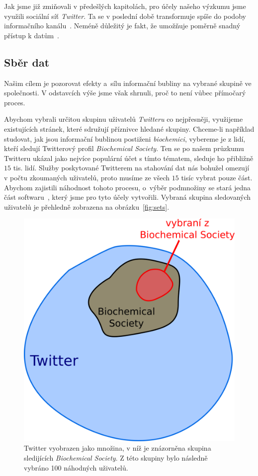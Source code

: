 \documentclass[12pt, a4paper]{article}
\numberwithin{equation}{section} 	%
\begin{document}
Jak jsme již zmiňovali v předešlých kapitolách, pro účely našeho výzkumu jsme využili sociální síť \textit{Twitter}. Ta se v poslední době transformuje spíše do podoby informačního kanálu~\cite{whyNotFb}. Neméně důležitý je fakt, že umožňuje poměrně snadný přístup k datům~\cite{tweepy, twitterAPI}.

\subsection{Sběr dat}
\noindent Našim cílem je pozorovat efekty a~sílu informační bubliny na vybrané skupině ve společnosti. V odstavcích výše jsme však shrnuli, proč to není vůbec přímočarý proces.

Abychom vybrali určitou skupinu uživatelů \textit{Twitteru} co nejpřesněji, využijeme existujících stránek, které sdružují příznivce hledané skupiny. Chceme-li například studovat, jak jsou informační bublinou postiženi \textit{biochemici}, vybereme je z lidí, kteří sledují Twitterový profil \textit{Biochemical Society}. Ten se po našem průzkumu Twitteru ukázal jako nejvíce populární účet s tímto tématem, sleduje ho přibližně $15$ tis. lidí. Služby poskytované Twitterem na stahování dat nás bohužel omezují v počtu zkoumaných uživatelů, proto musíme ze všech $15$ tisíc vybrat pouze část. Abychom zajistili náhodnost tohoto procesu, o~výběr podmnožiny se stará jedna část softwaru~\cite{myRepo}, který jsme pro tyto účely vytvořili. Vybraná skupina sledovaných uživatelů je přehledně zobrazena na obrázku~\autoref{fig:sets}.
\begin{figure}[h]
\centering
\includegraphics[scale=0.27]{./Pics/sets.png}
    \caption{Twitter vyobrazen jako množina, v níž je znázorněna skupina sledijících \textit{Biochemical Society}. Z této skupiny bylo následně vybráno 100 náhodných uživatelů.}
\label{fig:sets}
\end{figure}
\end{document}
